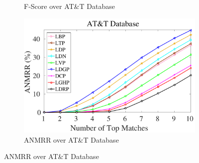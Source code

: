 \documentclass[a4paper]{article}
\begin{document}
\begin{figure}[!t]
\begin{subfigure}{.25\textwidth}
    \caption{F-Score over AT\&T Database}
    \label{fig:att-f}
  \end{subfigure}%
    \begin{subfigure}{.25\textwidth}
    \centering
    \includegraphics[width=.98\linewidth]{att-anmrr}
    \caption{ANMRR over AT\&T Database}
    \label{fig:att-anmrr}
  \end{subfigure}
  \vspace{3mm}
  

\end{figure}
\end{document}
